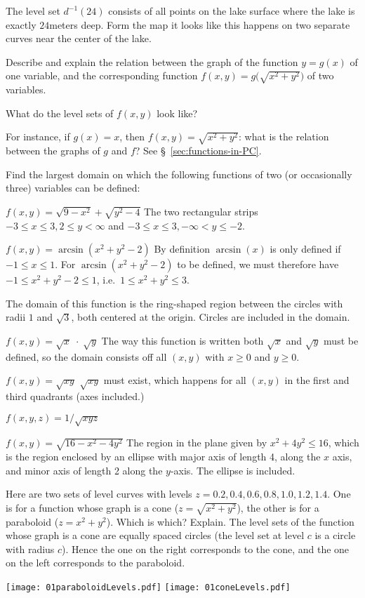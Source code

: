 \begin{multicols}{2}
The level set $d^{-1}(24)$ consists of all points on the lake surface where the
lake is exactly $24$meters deep.  Form the map it looks like this happens on two
separate curves near the center of the lake.
\endanswer



\problem Describe and explain the relation between the graph of the 
function $y=g(x)$ of one variable, and the corresponding function
$f(x, y) = g\bigl( \sqrt{x^2+y^2} \bigr)$ of two variables.

What do the level sets of $f(x, y)$ look like?

For instance, if $g(x) = x$, then $f(x, y) = \sqrt{x^2+y^2}$: what is
the relation between the graphs of $g$ and $f$?
\answer
See \S~\ref{sec:functions-in-PC}.
\endanswer


\problem Find the largest domain on which 
the following functions of two (or occasionally three) variables can be defined:

\subprob  $f(x, y) = \sqrt{9-x^2}+\sqrt{y^2-4}$
\answer
The two rectangular strips $-3\leq x\leq3, 2\leq y<\infty$ and
$-3\leq x\leq3, -\infty<y\leq-2$.
\endanswer

\subprob  $f(x, y) = \arcsin(x^2+y^2-2)$
\answer
By definition $\arcsin(x)$ is only defined if $-1\leq x\leq1$.
For $\arcsin(x^2+y^2-2)$ to be defined, we must therefore have
$-1\leq x^2+y^2-2 \leq 1$, i.e.\ $1\leq x^2+y^2 \leq 3$.

The domain of this function is
the ring-shaped region between the circles with radii $1$ and
$\sqrt{3}$, both centered at the origin.
Circles are included in the domain.
\endanswer

\subprob  $f(x, y) = \sqrt{x}\;\cdot\;\sqrt{y}$
\answer
The way this function is written both $\sqrt x$ and $\sqrt y$ must be defined,
so the domain consists off all $(x,y)$ with $x\geq0$ and $y\geq0$.
\endanswer

\subprob  $f(x, y) = \sqrt{xy}$
\answer
$\sqrt{xy}$ must exist, which happens for all $(x,y)$ in the first
and third quadrants (axes included.)
\endanswer

\subprob  $f(x, y, z) = 1/\sqrt{xyz}$

\subprob  $f(x, y) = \sqrt{16-x^2-4y^2}$
\answer
The region in the plane given by $x^2+4y^2\leq16$, which is the region
enclosed by an ellipse with
major axis of length 4, along the $x$ axis, and minor axis of length
2 along the $y$-axis.  The ellipse is included.
\endanswer

\problem\label{prb:cone-or-paraboloid}
Here are two sets of level curves with levels $z=0.2, 0.4, 0.6, 0.8,
1.0, 1.2,  1.4$.  One is for a function whose graph is a cone
($z=\sqrt{x^2+y^2}$), the other is for a paraboloid ($z=x^2+y^2$).
Which is which? Explain.
\answer
The level sets of the function whose graph is a cone are equally spaced circles
(the level set at level $c$ is a circle with radius $c$).  Hence the one on the
right corresponds to the cone, and
the one on the left corresponds to the paraboloid.
\endanswer
\begin{center}
  \texttt{[image: 01paraboloidLevels.pdf]}
  \quad
  \texttt{[image: 01coneLevels.pdf]}
\end{center}


\end{multicols}
